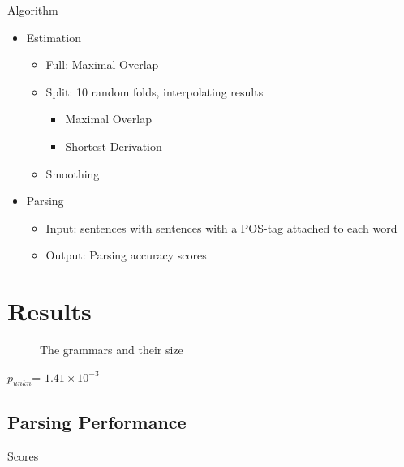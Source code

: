 \documentclass{beamer}
\begin{document}
\begin{frame}{Algorithm}
\begin{itemize}
	\item Estimation
		\begin{itemize}
			\item Full: Maximal Overlap
			\item Split: 10 random folds, interpolating results
				\begin{itemize} 
					\item Maximal Overlap 
					\item Shortest Derivation
				\end{itemize}
			\item Smoothing
		\end{itemize}
	\item Parsing
		\begin{itemize}
			\item Input: sentences with  sentences with a POS-tag attached to each word
			\item Output: Parsing accuracy scores
		\end{itemize}
\end{itemize}
\end{frame}

\section{Results}
\begin{frame}
\begin{figure}[h!]
\caption{The grammars and their size}
\end{figure}
$p_{unkn}$= $1.41\times 10^{-3}$
\end{frame}

\subsection{Parsing Performance}
\begin{frame}{Scores}
\footnotesize
\begin{table}

\end{table}
\end{frame}
\end{document}
